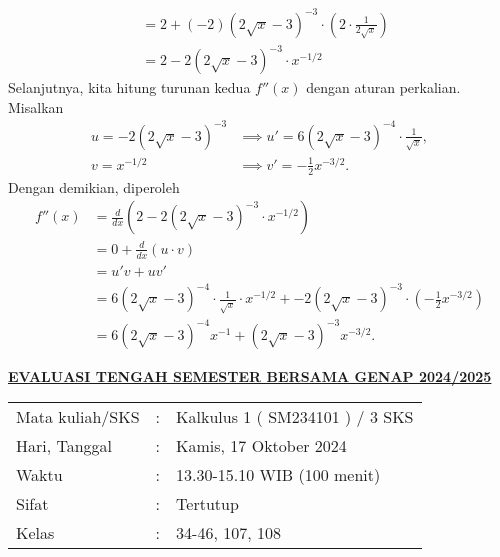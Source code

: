 \documentclass[11pt,openany,a4paper]{article}
\renewcommand{\headrulewidth}{0pt}
\renewcommand{\footrulewidth}{0pt}
\begin{document}
\begin{enumerate}
\begin{align*}
                    & =2 + (-2)(2\sqrt{x} - 3)^{-3} \cdot \left(2 \cdot \frac{1}{2\sqrt{x}}\right) \\
                    & =2 - 2(2\sqrt{x} - 3)^{-3} \cdot x^{-1/2}
          \end{align*}
          Selanjutnya, kita hitung turunan kedua $f''(x)$ dengan aturan perkalian. Misalkan
          \begin{align*}
              u  = -2(2\sqrt{x} - 3)^{-3} & \implies u' = 6(2\sqrt{x} - 3)^{-4} \cdot \frac{1}{\sqrt{x}}, \\
              v  = x^{-1/2}               & \implies v' = - \frac{1}{2} x^{-3/2}.
          \end{align*}
          Dengan demikian, diperoleh
          \begin{align*}
              f''(x) & = \frac{d}{dx}\left(2 - 2(2\sqrt{x} - 3)^{-3} \cdot x^{-1/2}\right)                                                               \\
                     & = 0 + \frac{d}{dx}\left(u \cdot v\right)                                                                                          \\
                     & = u'v + uv'                                                                                                                       \\
                     & = 6(2\sqrt{x} - 3)^{-4} \cdot \frac{1}{\sqrt{x}} \cdot x^{-1/2} + -2(2\sqrt{x} - 3)^{-3} \cdot \left(-\frac{1}{2} x^{-3/2}\right) \\
                     & = 6(2\sqrt{x} - 3)^{-4} x^{-1} + (2\sqrt{x} - 3)^{-3} x^{-3/2}.
          \end{align*}
\end{enumerate}

\newpage
\renewcommand{\arraystretch}{1}
\fancyhead{}
\fancyfoot{}
\fancyhead[r]{}
\renewcommand{\headrulewidth}{0pt}
\renewcommand{\footrulewidth}{0pt}
\begin{center}
    {\underline{\textbf{\MakeUppercase{Evaluasi Tengah Semester Bersama Genap 2024/2025}}}}
\end{center}

\begin{center}
    \begin{tabular}{lcl}
        Mata kuliah/SKS & : & Kalkulus 1 ( SM234101 ) / 3 SKS \\
        Hari, Tanggal   & : & Kamis, 17 Oktober 2024          \\
        Waktu           & : & 13.30-15.10 WIB (100 menit)     \\
        Sifat           & : & Tertutup                        \\
        Kelas           & : & 34-46, 107, 108
    \end{tabular}
\end{center}
\end{document}
